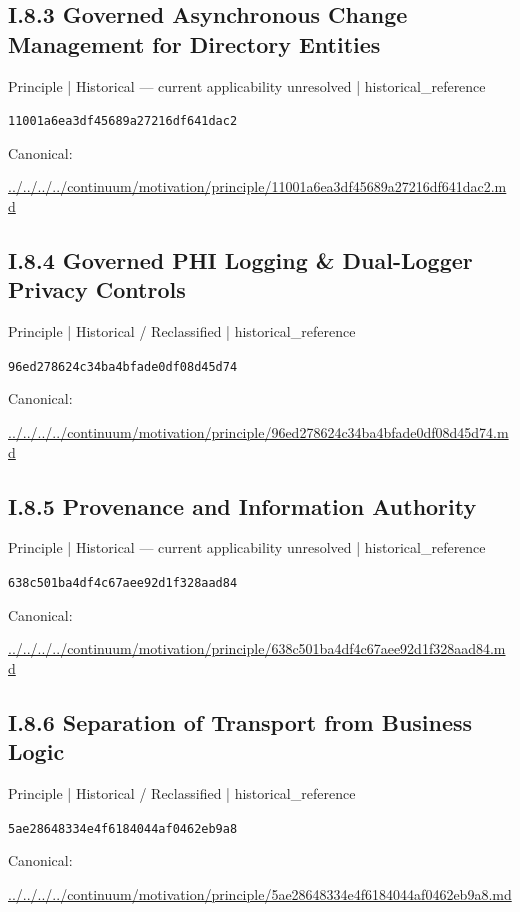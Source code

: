 \documentclass[10pt,a4paper]{article}
\begin{document}
\subsection*{I.8.3 Governed Asynchronous Change Management for Directory Entities}
{\small Principle | Historical — current applicability unresolved | historical\_reference}\par
\texttt{11001a6ea3df45689a27216df641dac2}\par
Canonical: \par
{\footnotesize\url{../../../../continuum/motivation/principle/11001a6ea3df45689a27216df641dac2.md}}\par
\subsection*{I.8.4 Governed PHI Logging \& Dual-Logger Privacy Controls}
{\small Principle | Historical / Reclassified | historical\_reference}\par
\texttt{96ed278624c34ba4bfade0df08d45d74}\par
Canonical: \par
{\footnotesize\url{../../../../continuum/motivation/principle/96ed278624c34ba4bfade0df08d45d74.md}}\par
\subsection*{I.8.5 Provenance and Information Authority}
{\small Principle | Historical — current applicability unresolved | historical\_reference}\par
\texttt{638c501ba4df4c67aee92d1f328aad84}\par
Canonical: \par
{\footnotesize\url{../../../../continuum/motivation/principle/638c501ba4df4c67aee92d1f328aad84.md}}\par
\subsection*{I.8.6 Separation of Transport from Business Logic}
{\small Principle | Historical / Reclassified | historical\_reference}\par
\texttt{5ae28648334e4f6184044af0462eb9a8}\par
Canonical: \par
{\footnotesize\url{../../../../continuum/motivation/principle/5ae28648334e4f6184044af0462eb9a8.md}}\par
\end{document}
